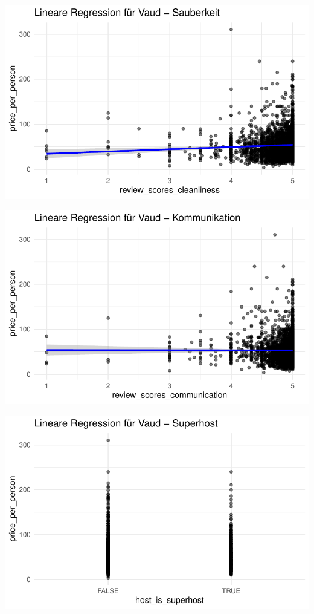 \documentclass[
  journal,
]{IEEEtran}%
\begin{document}
\includegraphics{main_files/figure-pdf/unnamed-chunk-15-2.pdf}

\includegraphics{main_files/figure-pdf/unnamed-chunk-15-3.pdf}

\includegraphics{main_files/figure-pdf/unnamed-chunk-15-4.pdf}
\end{document}
